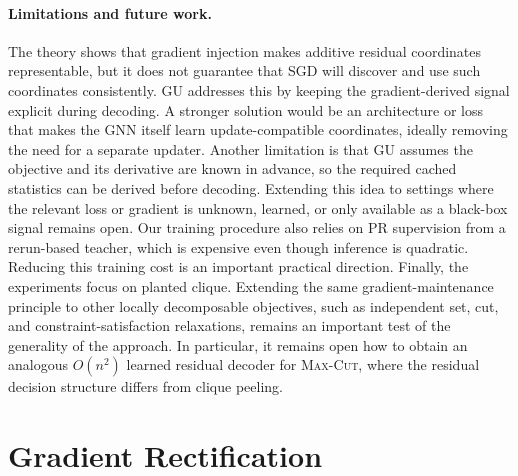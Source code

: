 \documentclass[11pt]{article}
\theoremstyle{plain}
\theoremstyle{remark}
\begin{document}
\paragraph{Limitations and future work.}
The theory shows that gradient injection makes additive residual coordinates
representable, but it does not guarantee that SGD will discover and use such
coordinates consistently. GU addresses this by keeping the gradient-derived
signal explicit during decoding. A stronger solution would be an architecture
or loss that makes the GNN itself learn update-compatible coordinates, ideally
removing the need for a separate updater. Another limitation is that GU assumes
the objective and its derivative are known in advance, so the required cached
statistics can be derived before decoding. Extending this idea to settings where
the relevant loss or gradient is unknown, learned, or only available as a
black-box signal remains open. Our training procedure also relies on PR
supervision from a rerun-based teacher, which is expensive even though inference
is quadratic. Reducing this training cost is an important practical direction.
Finally, the experiments focus on planted clique. Extending the same
gradient-maintenance principle to other locally decomposable objectives, such
as independent set, cut, and constraint-satisfaction relaxations, remains an
important test of the generality of the approach. In particular, it remains open
how to obtain an analogous $O(n^2)$ learned residual decoder for
\textsc{Max-Cut}, where the residual decision structure differs from clique
peeling.





\appendix
\section{Gradient Rectification}
\label{app:rectification}
\end{document}
